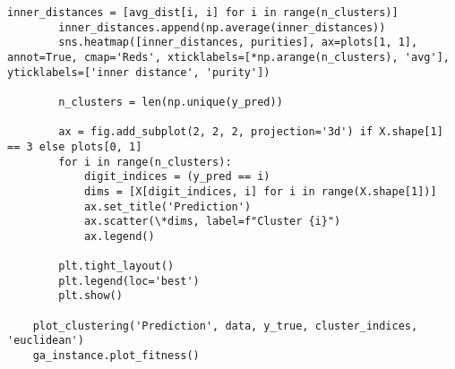 \begin{lstlisting}[label=lst:1,caption=Кластеризация с использованием генетического алгоритма]
		inner_distances = [avg_dist[i, i] for i in range(n_clusters)]
		inner_distances.append(np.average(inner_distances))
		sns.heatmap([inner_distances, purities], ax=plots[1, 1], annot=True, cmap='Reds', xticklabels=[*np.arange(n_clusters), 'avg'], yticklabels=['inner distance', 'purity'])
		
		n_clusters = len(np.unique(y_pred))
		
		ax = fig.add_subplot(2, 2, 2, projection='3d') if X.shape[1] == 3 else plots[0, 1]
		for i in range(n_clusters):
			digit_indices = (y_pred == i)
			dims = [X[digit_indices, i] for i in range(X.shape[1])]
			ax.set_title('Prediction')
			ax.scatter(\*dims, label=f"Cluster {i}")
			ax.legend()
		
		plt.tight_layout()
		plt.legend(loc='best')
		plt.show()
	
	plot_clustering('Prediction', data, y_true, cluster_indices, 'euclidean')
	ga_instance.plot_fitness()
\end{lstlisting}

\clearpage
